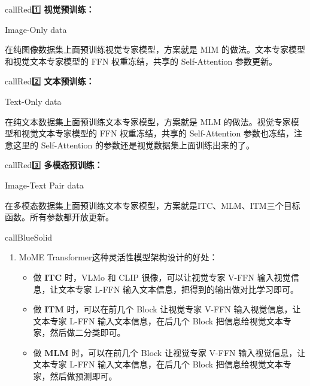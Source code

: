 \documentclass[zihao=false,fontset=windows]{ctexart}
\newcommand{\redb}[1]{\textcolor{feishuRed}{\textbf{#1}}}
\newcommand{\blu}[1]{\textcolor{feishuBlue}{#1}}
\newcommand{\yel}[1]{\colorbox{hiYellow}{#1}}
\begin{document}
\begin{tcbraster}[raster columns=3, raster equal height=rows, raster column skip=9pt, raster row skip=8pt, raster left skip=0pt, raster right skip=0pt]
\begin{feishuboxnb}{callRed}{1️⃣}
\redb{视觉预训练：}\par
Image-Only data\par
在纯图像数据集上面预训练视觉专家模型，方案就是 MIM 的做法。\blu{文本专家模型和视觉文本专家模型的 FFN 权重冻结，共享的 Self-Attention 参数更新。}\par
\end{feishuboxnb}
\begin{feishuboxnb}{callRed}{2️⃣}
\redb{文本预训练：}\par
Text-Only data\par
在纯文本数据集上面预训练文本专家模型，方案就是 MLM 的做法。\blu{视觉专家模型和视觉文本专家模型的 FFN 权重冻结，共享的 Self-Attention 参数也冻结，注意这里的 Self-Attention 的参数还是视觉数据集上面训练出来的了。}\par
\end{feishuboxnb}
\begin{feishuboxnb}{callRed}{3️⃣}
\redb{多模态预训练：}\par
Image-Text Pair data\par
在多模态数据集上面预训练文本专家模型，方案就是ITC、MLM、ITM三个目标函数。\blu{所有参数都开放更新。}\par
\end{feishuboxnb}
\end{tcbraster}

\begin{feishubox}{callBlueSolid}{🙋}
\begin{enumerate}
\item \yel{MoME Transformer这种灵活性模型架构设计的好处：}
\begin{itemize}
\item 做 \textbf{ITC} 时，VLMo 和 CLIP 很像，可以让视觉专家 V-FFN 输入视觉信息，让文本专家 L-FFN 输入文本信息，把得到的输出做对比学习即可。
\item 做 \textbf{ITM} 时，可以在前几个 Block 让视觉专家 V-FFN 输入视觉信息，让文本专家 L-FFN 输入文本信息，在后几个 Block 把信息给视觉文本专家，然后做二分类即可。
\item 做\textbf{ MLM} 时，可以在前几个 Block 让视觉专家 V-FFN 输入视觉信息，让文本专家 L-FFN 输入文本信息，在后几个 Block 把信息给视觉文本专家，然后做预测即可。
\end{itemize}
\end{enumerate}
\end{feishubox}
\end{document}

